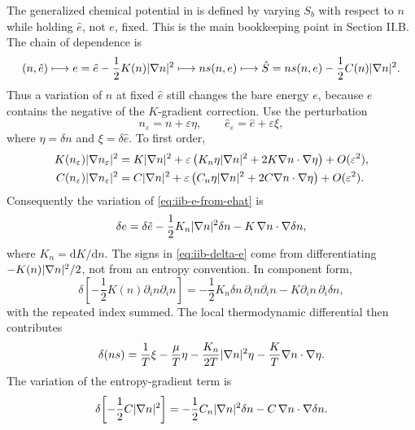 The generalized chemical potential in  is defined by varying
\(S_b\) with respect to \(n\) while holding \(\hat e\), not \(e\), fixed.
This is the main bookkeeping point in Section II.B.  The chain of dependence is
\[
  (n,\hat e) \longmapsto e=\hat e-\frac12K(n)|\nabla n|^2
  \longmapsto n s(n,e)
  \longmapsto \hat S=n s(n,e)-\frac12 C(n)|\nabla n|^2 .
\]
Thus a variation of \(n\) at fixed \(\hat e\) still changes the bare energy
\(e\), because \(e\) contains the negative of the \(K\)-gradient correction.
Use the perturbation
\[
  n_\varepsilon=n+\varepsilon\eta,
  \qquad
  \hat e_\varepsilon=\hat e+\varepsilon\xi,
\]
where \(\eta=\delta n\) and \(\xi=\delta\hat e\).  To first order,
\begin{align}
  K(n_\varepsilon)|\nabla n_\varepsilon|^2
  &=K|\nabla n|^2
    +\varepsilon\left(K_n\eta|\nabla n|^2
    +2K\nabla n\cdot\nabla\eta\right)+O(\varepsilon^2),
  \label{eq:iib-K-first-order-expansion}\\
  C(n_\varepsilon)|\nabla n_\varepsilon|^2
  &=C|\nabla n|^2
    +\varepsilon\left(C_n\eta|\nabla n|^2
    +2C\nabla n\cdot\nabla\eta\right)+O(\varepsilon^2).
  \label{eq:iib-C-first-order-expansion}
\end{align}
Consequently the variation of \eqref{eq:iib-e-from-ehat} is
\begin{equation}
  \delta e
  =
  \delta\hat e
  -
  \frac{1}{2}K_n|\nabla n|^2\delta n
  -
  K\,\nabla n\cdot\nabla\delta n ,
  \label{eq:iib-delta-e}
\end{equation}
where \(K_n=\mathrm{d}K/\mathrm{d}n\).  The signs in
\eqref{eq:iib-delta-e} come from differentiating
\(-K(n)|\nabla n|^2/2\), not from an entropy convention.  In component form,
\[
  \delta\left[-\frac12K(n)\partial_i n\partial_i n\right]
  =-\frac12K_n\delta n\,\partial_i n\partial_i n
   -K\partial_i n\,\partial_i\delta n,
\]
with the repeated index summed.  The local thermodynamic differential
then contributes
\begin{equation}
  \delta(ns)
  =
  \frac{1}{T}\xi
  -\frac{\mu}{T}\eta
  -\frac{K_n}{2T}|\nabla n|^2\eta
  -\frac{K}{T}\nabla n\cdot\nabla\eta .
  \label{eq:iib-local-entropy-first-variation-expanded}
\end{equation}
The variation of the entropy-gradient term is
\begin{equation}
  \delta\!\left[-\frac{1}{2}C|\nabla n|^2\right]
  =
  -\frac{1}{2}C_n|\nabla n|^2\delta n
  -
  C\,\nabla n\cdot\nabla\delta n .
  \label{eq:iib-delta-gradient-entropy}
\end{equation}

